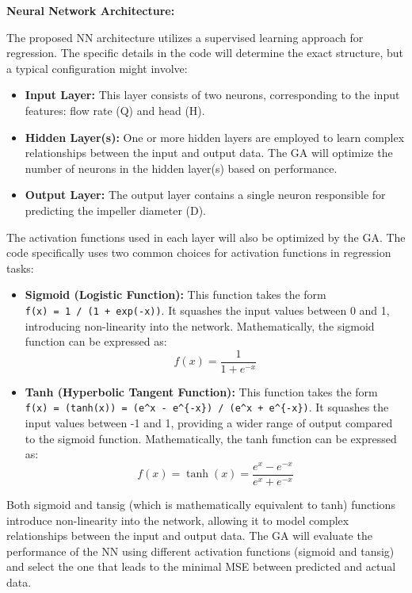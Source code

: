 \documentclass[
  super,
  review,
  3p]{elsarticle}
\providecommand{\tightlist}{%
  \setlength{\itemsep}{0pt}\setlength{\parskip}{0pt}}\usepackage{longtable,booktabs,array}
\begin{document}
\textbf{Neural Network Architecture:}

The proposed NN architecture utilizes a supervised learning approach for
regression. The specific details in the code will determine the exact
structure, but a typical configuration might involve:

\begin{itemize}
\tightlist
\item
  \textbf{Input Layer:} This layer consists of two neurons,
  corresponding to the input features: flow rate (Q) and head (H).
\item
  \textbf{Hidden Layer(s):} One or more hidden layers are employed to
  learn complex relationships between the input and output data. The GA
  will optimize the number of neurons in the hidden layer(s) based on
  performance.
\item
  \textbf{Output Layer:} The output layer contains a single neuron
  responsible for predicting the impeller diameter (D).
\end{itemize}

The activation functions used in each layer will also be optimized by
the GA. The code specifically uses two common choices for activation
functions in regression tasks:

\begin{itemize}
\item
  \textbf{Sigmoid (Logistic Function):} This function takes the form
  \texttt{f(x)\ =\ 1\ /\ (1\ +\ exp(-x))}. It squashes the input values
  between 0 and 1, introducing non-linearity into the network.
  Mathematically, the sigmoid function can be expressed as: \[
  f(x) = \frac{1}{1 + e^{-x}}
  \]
\item
  \textbf{Tanh (Hyperbolic Tangent Function):} This function takes the
  form
  \texttt{f(x)\ =\ (tanh(x))\ =\ (e\^{}x\ -\ e\^{}\{-x\})\ /\ (e\^{}x\ +\ e\^{}\{-x\})}.
  It squashes the input values between -1 and 1, providing a wider range
  of output compared to the sigmoid function. Mathematically, the tanh
  function can be expressed as: \[
  f(x) = \tanh(x) = \frac{e^x - e^{-x}}{e^x + e^{-x}}
  \]
\end{itemize}

Both sigmoid and tansig (which is mathematically equivalent to tanh)
functions introduce non-linearity into the network, allowing it to model
complex relationships between the input and output data. The GA will
evaluate the performance of the NN using different activation functions
(sigmoid and tansig) and select the one that leads to the minimal MSE
between predicted and actual data.
\end{document}

